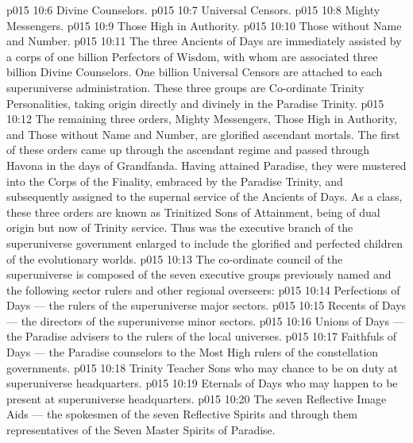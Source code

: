 \vs p015 10:6 \bibnobreakspace Divine Counselors.
\vs p015 10:7 \bibnobreakspace Universal Censors.
\vs p015 10:8 \bibnobreakspace Mighty Messengers.
\vs p015 10:9 \bibnobreakspace Those High in Authority.
\vs p015 10:10 \bibnobreakspace Those without Name and Number.
\vs p015 10:11 \pc The three Ancients of Days are immediately assisted by a corps of one billion Perfectors of Wisdom, with whom are associated three billion Divine Counselors. One billion Universal Censors are attached to each superuniverse administration. These three groups are Co\hyp{}ordinate Trinity Personalities, taking origin directly and divinely in the Paradise Trinity.
\vs p015 10:12 The remaining three orders, Mighty Messengers, Those High in Authority, and Those without Name and Number, are glorified ascendant mortals. The first of these orders came up through the ascendant regime and passed through Havona in the days of Grandfanda. Having attained Paradise, they were mustered into the Corps of the Finality, embraced by the Paradise Trinity, and subsequently assigned to the supernal service of the Ancients of Days. As a class, these three orders are known as Trinitized Sons of Attainment, being of dual origin but now of Trinity service. Thus was the executive branch of the superuniverse government enlarged to include the glorified and perfected children of the evolutionary worlds.
\vs p015 10:13 The co\hyp{}ordinate council of the superuniverse is composed of the seven executive groups previously named and the following sector rulers and other regional overseers:
\vs p015 10:14 \bibnobreakspace Perfections of Days --- the rulers of the superuniverse major sectors.
\vs p015 10:15 \bibnobreakspace Recents of Days --- the directors of the superuniverse minor sectors.
\vs p015 10:16 \bibnobreakspace Unions of Days --- the Paradise advisers to the rulers of the local universes.
\vs p015 10:17 \bibnobreakspace Faithfuls of Days --- the Paradise counselors to the Most High rulers of the constellation governments.
\vs p015 10:18 \bibnobreakspace Trinity Teacher Sons who may chance to be on duty at superuniverse headquarters.
\vs p015 10:19 \bibnobreakspace Eternals of Days who may happen to be present at superuniverse headquarters.
\vs p015 10:20 \bibnobreakspace The seven Reflective Image Aids --- the spokesmen of the seven Reflective Spirits and through them representatives of the Seven Master Spirits of Paradise.
